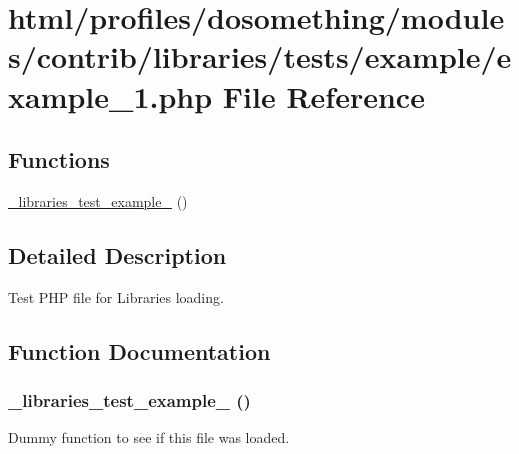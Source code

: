 \hypertarget{example__1_8php}{
\section{html/profiles/dosomething/modules/contrib/libraries/tests/example/example\_\-1.php File Reference}
\label{example__1_8php}
}
\subsection*{Functions}
\begin{DoxyCompactItemize}
\item 
\hyperlink{example__1_8php_a46fc5d83091700b0538b3aafd84f1eeb}{\_\-libraries\_\-test\_\-example\_} ()
\end{DoxyCompactItemize}


\subsection{Detailed Description}
Test PHP file for Libraries loading. 

\subsection{Function Documentation}
\hypertarget{example__1_8php_a46fc5d83091700b0538b3aafd84f1eeb}{
\subsubsection[{\_\-libraries\_\-test\_\-example\_\-1}]{\setlength{\rightskip}{0pt plus 5cm}\_\-libraries\_\-test\_\-example\_ ()}}
\label{example__1_8php_a46fc5d83091700b0538b3aafd84f1eeb}
Dummy function to see if this file was loaded. 